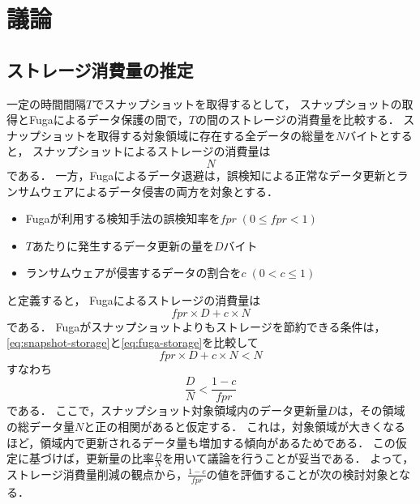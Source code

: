 \chapter{議論}
\label{chap:discussion}

\section{ストレージ消費量の推定}
一定の時間間隔$T$でスナップショットを取得するとして，
スナップショットの取得とFugaによるデータ保護の間で，$T$の間のストレージの消費量を比較する．
スナップショットを取得する対象領域に存在する全データの総量を$N$バイトとすると，
スナップショットによるストレージの消費量は
\begin{equation}
  \label{eq:snapshot-storage}
  N
\end{equation}
である．
一方，Fugaによるデータ退避は，誤検知による正常なデータ更新とランサムウェアによるデータ侵害の両方を対象とする．
\begin{itemize}
  \item Fugaが利用する検知手法の誤検知率を$fpr \;(0 \le fpr < 1)$
  \item $T$あたりに発生するデータ更新の量を$D$バイト
  \item ランサムウェアが侵害するデータの割合を$c \; (0 < c \le 1)$
\end{itemize}
と定義すると，
Fugaによるストレージの消費量は
\begin{equation}
  \label{eq:fuga-storage}
  fpr \times D + c \times N
\end{equation}
である．
Fugaがスナップショットよりもストレージを節約できる条件は，\eqref{eq:snapshot-storage}と\eqref{eq:fuga-storage}を比較して
\begin{equation}
  fpr \times D + c \times N < N
\end{equation}
すなわち
\begin{equation}
  \label{eq:storage-compare}
  \frac{D}{N} < \frac{1-c}{fpr}
\end{equation}
である．
ここで，スナップショット対象領域内のデータ更新量$D$は，その領域の総データ量$N$と正の相関があると仮定する．
これは，対象領域が大きくなるほど，領域内で更新されるデータ量も増加する傾向があるためである．
この仮定に基づけば，更新量の比率$\frac{D}{N}$を用いて議論を行うことが妥当である．
よって，ストレージ消費量削減の観点から，$\frac{1-c}{fpr}$の値を評価することが次の検討対象となる．


